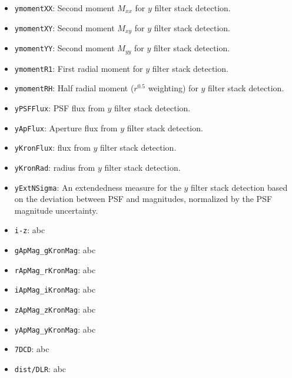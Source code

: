 \documentclass[twocolumn]{aastex63}
\begin{document}
\begin{itemize}
    \item \texttt{ymomentXX}: Second moment $M_{xx}$ for $y$ filter stack detection. 
    \item \texttt{ymomentXY}: Second moment $M_{xy}$ for $y$ filter stack detection. 
    \item \texttt{ymomentYY}: Second moment $M_{yy}$ for $y$ filter stack detection. 
    \item \texttt{ymomentR1}: First radial moment for $y$ filter stack detection.
    \item \texttt{ymomentRH}: Half radial moment ($r^{0.5}$ weighting) for $y$ filter stack detection.
    \item \texttt{yPSFFlux}: PSF flux from $y$ filter stack detection.
    \item \texttt{yApFlux}: Aperture flux from $y$ filter stack detection.
    \item \texttt{yKronFlux}: \cite{Kron1980} flux from $y$ filter stack detection.
    \item \texttt{yKronRad}: \cite{Kron1980} radius from $y$ filter stack detection.
    \item \texttt{yExtNSigma}: An extendedness measure for the $y$ filter stack detection based on the deviation between PSF and \cite{Kron1980} magnitudes, normalized by the PSF magnitude uncertainty.
    \item \texttt{i-z}: abc
    \item \texttt{gApMag\_gKronMag}: abc
    \item \texttt{rApMag\_rKronMag}: abc
    \item \texttt{iApMag\_iKronMag}: abc
    \item \texttt{zApMag\_zKronMag}: abc
    \item \texttt{yApMag\_yKronMag}: abc
    \item \texttt{7DCD}: abc
    \item \texttt{dist/DLR}: abc   
\end{itemize}
 




\end{document}
